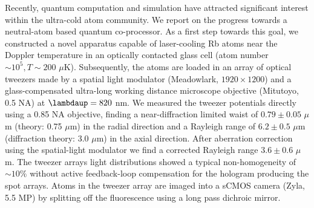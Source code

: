 \noindent Recently, quantum computation and simulation have attracted significant interest within the ultra-cold atom community.
We report on the progress towards a neutral-atom based quantum co-processor.
As a first step towards this goal, we constructed a novel apparatus capable of laser-cooling Rb atoms near the Doppler temperature in an optically contacted glass cell (atom number $\sim 10^5, T\sim 200$ $\mu$K). 
Subsequently, the atoms are loaded in an array of optical tweezers made by a spatial light modulator (Meadowlark, $1920 \times 1200$) and a glass-compensated ultra-long working distance microscope objective (Mitutoyo, 0.5 NA) at $\lambdaup = 820$ nm.
We measured the tweezer potentials directly using a 0.85 NA objective, finding a near-diffraction limited waist of $0.79\pm0.05$ $\mu$m (theory: 0.75 $\mu$m) in the radial direction and a Rayleigh range of $6.2 \pm 0.5$ $\mu$m (diffraction theory: 3.0 $\mu$m) in the axial direction.
After aberration correction using the spatial-light modulator we find a corrected Rayleigh range $3.6\pm0.6$ $\mu$m.
The tweezer arrays light distributions showed a typical non-homogeneity of $\sim 10\%$ without active feedback-loop compensation for the hologram producing the spot arrays. 
Atoms in the tweezer array are imaged into a sCMOS camera (Zyla, 5.5 MP) by splitting off the fluorescence using a long pass dichroic mirror.
